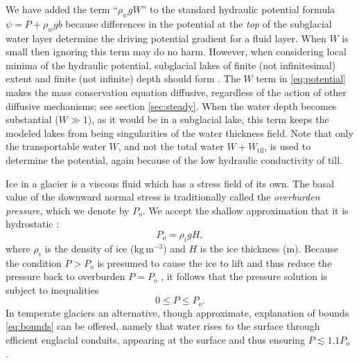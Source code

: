 \documentclass[gmd]{copernicus}   %
\newcommand{\text}{\textrm}
\newcommand{\Wtil}{W_{\text{til}}}
\begin{document}
We have added the term ``$\rho_w g W$'' to the standard hydraulic potential formula $\psi = P + \rho_w g b$ \citep{Clarke05,Shreve1972} because differences in the potential at the \emph{top} of the subglacial water layer determine the driving potential gradient for a fluid layer.  When $W$ is small then ignoring this term may do no harm.  However, when considering local minima of the hydraulic potential, subglacial lakes of finite (not infinitesimal) extent and finite (not infinite) depth should form \citep[compare][]{LeBrocqetal2009}.  The $W$ term in \eqref{eq:potential} makes the mass conservation equation diffusive, regardless of the action of other diffusive mechanisms; see section \ref{sec:steady}.  When the water depth becomes substantial ($W\gg 1$), as it would be in a subglacial lake, this term keeps the modeled lakes from being singularities of the water thickness field.  Note that only the transportable water $W$, and not the total water $W+\Wtil$, is used to determine the potential, again because of the low hydraulic conductivity of till.

Ice in a glacier is a viscous fluid which has a stress field of its own.  The basal value of the downward normal stress is traditionally called the \emph{overburden pressure}, which we denote by $P_o$.  We accept the shallow approximation that it is hydrostatic \citep{GreveBlatter2009}:
\begin{equation} \label{eq:hydrostatic}
  P_o = \rho_i g H,
\end{equation}
where $\rho_i$ is the density of ice ($\text{kg}\,\text{m}^{-3}$) and $H$ is the ice thickness (m).  Because the condition $P>P_o$ is presumed to cause the ice to lift and thus reduce the pressure back to overburden $P=P_o$ \citep{Schoofetal2012}, it follows that the pressure solution is subject to inequalities
\begin{equation}
0 \le P \le P_o. \label{eq:bounds}
\end{equation}
In temperate glaciers an alternative, though approximate, explanation of bounds \eqref{eq:bounds} can be offered, namely that water rises to the surface through efficient englacial conduits, appearing at the surface and thus ensuring $P\lesssim 1.1 P_o$ \citep{Bartholomausetal2011}.
\end{document}
